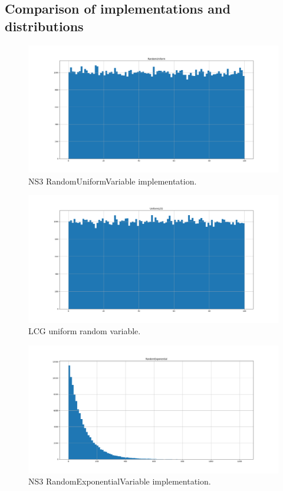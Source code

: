 \documentclass{article}
\begin{document}
  \subsection{Comparison of implementations and distributions}
  \begin{figure}
    \caption{NS3 RandomUniformVariable implementation.}
    \centering
      \includegraphics[width=\linewidth]{ns3uniform.png}
  \end{figure}
  \begin{figure}
    \caption{LCG uniform random variable.}
    \centering
      \includegraphics[width=\linewidth]{uniformLCG.png}
  \end{figure}
  \begin{figure}
    \caption{NS3 RandomExponentialVariable implementation.}
    \centering
      \includegraphics[width=\linewidth]{ns3exponential.png}
  \end{figure}
\end{document}
